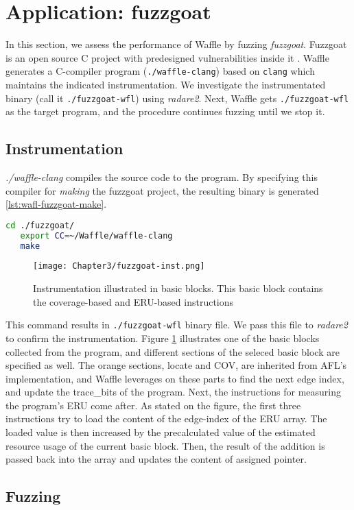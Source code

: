 \section{Application: fuzzgoat}
\label{sec:3-3}

In this section, we assess the performance of Waffle by fuzzing \textit{fuzzgoat}. Fuzzgoat is an open source C project with predesigned vulnerabilities inside it \cite{fuzzgoat}. Waffle generates a C-compiler program (\texttt{./waffle-clang}) based on \texttt{clang} which maintains the indicated instrumentation. We investigate the instrumentated binary (call it \texttt{./fuzzgoat-wfl}) using \textit{radare2}. Next, Waffle gets \texttt{./fuzzgoat-wfl} as the target program, and the procedure continues fuzzing until we stop it. 


\subsection{Instrumentation}

\textit{./waffle-clang} compiles the source code to the program. By specifying this compiler for \textit{making} the fuzzgoat project, the resulting binary is generated \ref{lst:wafl-fuzzgoat-make}.

\begin{lstlisting}[language=bash,style=CommandStyle,label={lst:wafl-fuzzgoat-make}]
   cd ./fuzzgoat/
   export CC=~/Waffle/waffle-clang
   make
\end{lstlisting}


\begin{figure}[!b]
   \texttt{[image: Chapter3/fuzzgoat-inst.png]}
   \centering
   \caption{Instrumentation illustrated in basic blocks. This basic block contains the coverage-based and ERU-based instructions}
   \label{fig:fuzzgoat-inst}
\end{figure}

This command results in \texttt{./fuzzgoat-wfl} binary file. We pass this file to \textit{radare2} to confirm the instrumentation. Figure \ref{fig:fuzzgoat-inst} illustrates one of the basic blocks collected from the program, and different sections of the seleced basic block are specified as well. The orange sections, locate and COV, are inherited from AFL's implementation, and Waffle leverages on these parts to find the next edge index, and update the trace\_bits of the program. Next, the instructions for measuring the program's ERU come after. As stated on the figure, the first three instructions try to load the content of the edge-index of the ERU array. The loaded value is then increased by the precalculated value of the estimated resource usage of the current basic block. Then, the result of the addition is passed back into the array and updates the content of assigned pointer.


\subsection{Fuzzing}